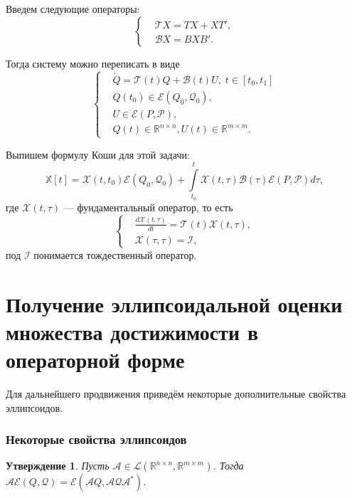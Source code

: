 \documentclass[12pt]{article}
\theoremstyle{rusdef}
\newtheorem{statement}{Утверждение}
\newcommand{\R}{\ensuremath{\mathbb{R}}} %
\newcommand{\E}{\ensuremath{\mathcal{E}}} %
\begin{document}
Введем следующие операторы:
$$
\left\{
\begin{aligned}
& \mathcal{T}X = TX + XT',\\
& \mathcal{B}X = BXB'.
\end{aligned}
\right.
$$

Тогда систему можно переписать в виде
$$
\left\{
\begin{aligned}
& \dot{Q} = \mathcal{T}(t)Q + \mathcal{B}(t)U, \; t \in [t_0,t_1]\\
& Q(t_0) \in \E(Q_0,\mathcal{Q}_0),\\
& U \in \E(P,\mathcal{P}),\\
& Q(t) \in \R^{n \times n}, U(t) \in \R^{m \times m}.
\end{aligned}
\right.
$$

Выпишем формулу Коши для этой задачи:
$$
\mathbb{X}[t] = \mathcal{X}(t,t_0)\E(Q_0,\mathcal{Q}_0) + \int\limits_{t_0}^{t} \mathcal{X}(t,\tau)\mathcal{B}(\tau)\E(P,\mathcal{P}) d\tau,
$$
где $\mathcal{X}(t,\tau)$ --- фундаментальный оператор, то есть
$$
\left\{
\begin{aligned}
&\frac{d\mathcal{X}(t,\tau)}{dt} = \mathcal{T}(t) \mathcal{X}(t,\tau),\\
&\mathcal{X}(\tau,\tau) = \mathcal{I},
\end{aligned}
\right.
$$
под $\mathcal{I}$ понимается тождественный оператор.

\section{Получение эллипсоидальной оценки множества достижимости в операторной форме}
Для дальнейшего продвижения приведём некоторые дополнительные свойства эллипсоидов.

\subsubsection*{Некоторые свойства эллипсоидов}
\begin{statement}
Пусть $\mathcal{A} \in \mathscr{L}(\R^{n \times n},\R^{m \times m})$. Тогда $\mathcal{A}\E(Q,\mathcal{Q}) = \E(\mathcal{A}Q, \mathcal{A}\mathcal{Q}\mathcal{A}^*)$.
\end{statement}
\end{document}
